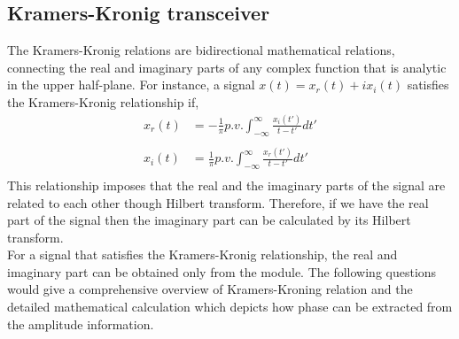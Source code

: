 \subsection{Kramers-Kronig transceiver}
The Kramers-Kronig relations are bidirectional mathematical relations, connecting the real and imaginary parts of any complex function that is analytic in the upper half-plane. For instance, a signal $x(t)=x_r(t) + i x_i(t)$ satisfies the Kramers-Kronig relationship if,
\begin{equation*}
\begin{split}
x_{r}(t) &=-\frac{1}{\pi} p.v. \int_{-\infty}^{\infty} \frac{x_{i}(t')}{t-t'} dt' \\ \\
x_{i}(t) &=\frac{1}{\pi} p.v. \int_{-\infty}^{\infty} \frac{x_{r}(t')}{t-t'} dt' \\
\end{split}
\label{KK}
\end{equation*}
This relationship imposes that the real and the imaginary parts of the signal are related to each other though Hilbert transform. Therefore, if we have the real part of the signal then the imaginary part can be calculated by its Hilbert transform. \\For a signal that satisfies the Kramers-Kronig relationship, the real and imaginary part can be obtained only from the module. The following questions would give a comprehensive overview of Kramers-Kroning relation and the detailed mathematical calculation which depicts how phase can be extracted from the amplitude information.

